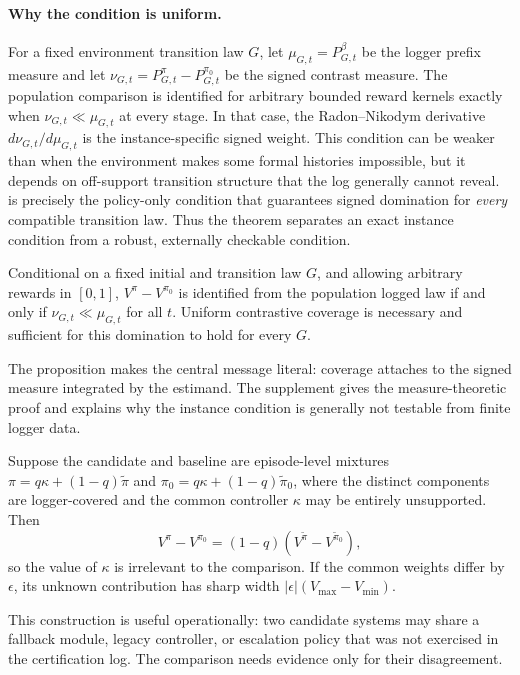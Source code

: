 \paragraph{Why the condition is uniform.}
For a fixed environment transition law $G$, let $\mu_{G,t}=P_{G,t}^{\beta}$ be the logger prefix measure and let $\nu_{G,t}=P_{G,t}^{\pi}-P_{G,t}^{\pi_0}$ be the signed contrast measure. The population comparison is identified for arbitrary bounded reward kernels exactly when $\nu_{G,t}\ll\mu_{G,t}$ at every stage. In that case, the Radon--Nikodym derivative $d\nu_{G,t}/d\mu_{G,t}$ is the instance-specific signed weight. This condition can be weaker than \UCC when the environment makes some formal histories impossible, but it depends on off-support transition structure that the log generally cannot reveal. \UCC is precisely the policy-only condition that guarantees signed domination for \emph{every} compatible transition law. Thus the theorem separates an exact instance condition from a robust, externally checkable condition.

\begin{proposition}
\label{prop:instance}
Conditional on a fixed initial and transition law $G$, and allowing arbitrary rewards in $[0,1]$, $V^\pi-V^{\pi_0}$ is identified from the population logged law if and only if $\nu_{G,t}\ll\mu_{G,t}$ for all $t$. Uniform contrastive coverage is necessary and sufficient for this domination to hold for every $G$.
\end{proposition}
The proposition makes the central message literal: coverage attaches to the signed measure integrated by the estimand. The supplement gives the measure-theoretic proof and explains why the instance condition is generally not testable from finite logger data.

\begin{corollary}
Suppose the candidate and baseline are episode-level mixtures
$\pi=q\kappa+(1-q)\widetilde\pi$ and
$\pi_0=q\kappa+(1-q)\widetilde\pi_0$, where the distinct components are logger-covered and the common controller $\kappa$ may be entirely unsupported. Then
\[
V^\pi-V^{\pi_0}=(1-q)(V^{\widetilde\pi}-V^{\widetilde\pi_0}),
\]
so the value of $\kappa$ is irrelevant to the comparison. If the common weights differ by $\epsilon$, its unknown contribution has sharp width $|\epsilon|(V_{\max}-V_{\min})$.
\label{cor:mixture}
\end{corollary}

This construction is useful operationally: two candidate systems may share a fallback module, legacy controller, or escalation policy that was not exercised in the certification log. The comparison needs evidence only for their disagreement.


